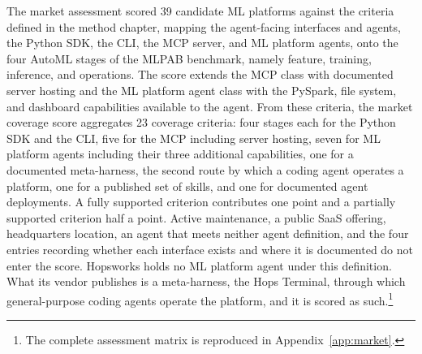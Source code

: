 \documentclass[
english,                 %
bibtex,                  %
]{kththesis}
\numberwithin{listing}{chapter}
\begin{document}
The market assessment scored 39 candidate \gls{ML} platforms against the criteria defined in the method chapter, mapping the agent-facing interfaces and agents, the Python \gls{SDK}, the \gls{CLI}, the \gls{MCP} server, and \gls{ML} platform agents, onto the four \gls{AutoML} stages of the \gls{MLPAB} benchmark, namely feature, training, inference, and operations. The score extends the \gls{MCP} class with documented server hosting and the \gls{ML} platform agent class with the PySpark, file system, and dashboard capabilities available to the agent. From these criteria, the market coverage score aggregates 23 coverage criteria: four stages each for the Python \gls{SDK} and the \gls{CLI}, five for the \gls{MCP} including server hosting, seven for \gls{ML} platform agents including their three additional capabilities, one for a documented meta-harness, the second route by which a coding agent operates a platform, one for a published set of skills, and one for documented agent deployments. A fully supported criterion contributes one point and a partially supported criterion half a point. Active maintenance, a public \gls{SaaS} offering, headquarters location, an agent that meets neither agent definition, and the four entries recording whether each interface exists and where it is documented do not enter the score. Hopsworks holds no \gls{ML} platform agent under this definition. What its vendor publishes is a meta-harness, the Hops Terminal, through which general-purpose coding agents operate the platform, and it is scored as such.\footnote{The complete assessment matrix is reproduced in Appendix~\ref{app:market}.}
\end{document}
